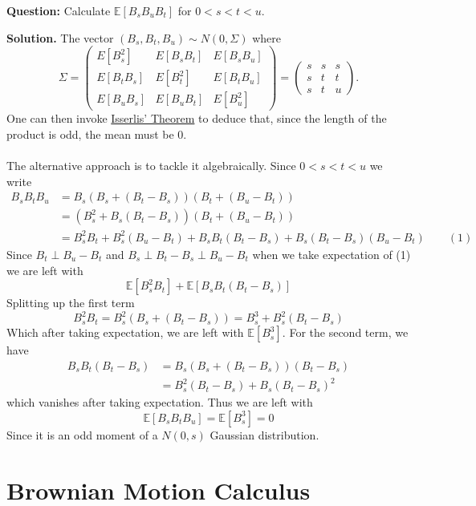 \documentclass{article}
\begin{document}
\begin{tcolorbox}[colframe=black,colback=gray!5,boxrule=0.5pt]
\textbf{Question:} Calculate $\mathbb{E}[B_sB_uB_t]$ for $0<s<t<u.$
\end{tcolorbox}
\textbf{Solution.} The vector $(B_s, B_t, B_u)\sim N(0,\Sigma)$ where 
\[
\Sigma = \begin{pmatrix}
E[B_s^2] & E[B_s B_t] & E[B_s B_u] \\
E[B_t B_s] & E[B_t^2] & E[B_t B_u] \\
E[B_u B_s] & E[B_u B_t] & E[B_u^2]
\end{pmatrix}
= 
\begin{pmatrix}
s & s & s \\
s & t & t \\
s & t & u
\end{pmatrix}.
\]
One can then invoke \href{https://en.wikipedia.org/wiki/Isserlis%27s_theorem}{Isserlis' Theorem} to deduce that, since the length of the product is odd, the mean must be 0. \\
\\
The alternative approach is to tackle it algebraically. Since $0<s<t<u$ we write
\begin{align*}
    B_sB_tB_u &= B_s(B_s+(B_t-B_s))(B_t+(B_u-B_t)) \\
    &= (B_s^2 + B_s(B_t-B_s))(B_t+(B_u-B_t)) \\
    &= B_s^2B_t + B_s^2(B_u-B_t)+B_sB_t(B_t-B_s) + B_s(B_t-B_s)(B_u-B_t) \quad\quad (1)
\end{align*}
Since $B_t\perp B_u-B_t$ and $B_s \perp B_t-B_s \perp B_u-B_t$ when we take expectation of (1) we are left with
$$\mathbb{E}[B_s^2B_t] + \mathbb{E}[B_s B_t(B_t-B_s)]$$
Splitting up the first term
$$B_s^2B_t = B_s^2 (B_s + (B_t-B_s)) = B_s^3 + B_s^2(B_t-B_s)$$
Which after taking expectation, we are left with $\mathbb{E}[B_s^3].$ For the second term, we have 
\begin{align*}
    B_sB_t(B_t-B_s)&=B_s(B_s+(B_t-B_s))(B_t-B_s) \\
    &=B_s^2(B_t-B_s)+B_s(B_t-B_s)^2
\end{align*}
which vanishes after taking expectation. Thus we are left with 
$$\mathbb{E}[B_sB_tB_u] = \mathbb{E}[B_s^3]=0$$
Since it is an odd moment of a $N(0,s)$ Gaussian distribution.
\newpage
\section{Brownian Motion Calculus}
\end{document}

